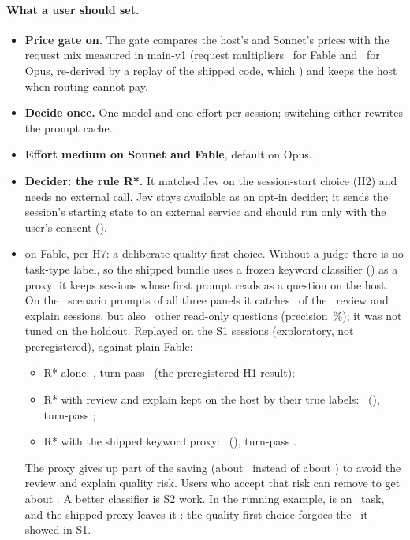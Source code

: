 \paragraph{What a user should set.}
\begin{itemize}
  \item \textbf{Price gate on.} The gate compares the host's and Sonnet's prices with the request mix measured in
    main-v1 (request multipliers \RpMultFable\ for Fable and \RpMultOpus\ for Opus, re-derived by a replay of the
    shipped code, which \RpPass) and keeps the host when routing cannot pay.
  \item \textbf{Decide once.} One model and one effort per session; switching either rewrites the prompt cache.
  \item \textbf{Effort medium on Sonnet and Fable}, default on Opus.
  \item \textbf{Decider: the rule R*.} It matched Jev on the session-start choice (H2) and needs no external call. Jev
    stays available as an opt-in decider; it sends the session's starting state to an external service and should run
    only with the user's consent ().
  \item \textbf{} on Fable, per H7: a deliberate quality-first choice. Without a
    judge there is no task-type label, so the shipped bundle uses a frozen keyword classifier (\code{\KpClassifier}) as a
    proxy: it keeps sessions whose first prompt reads as a question on the host. On the \KpPrompts\ scenario prompts of
    all three panels it catches \KpCaught\ of the \KpRexN\ review and explain sessions, but also \KpOthers\ other
    read-only questions (precision \KpPrecision\,\%); it was not tuned on the holdout. Replayed on the S1 sessions
    (exploratory, not preregistered), against plain Fable:
    \begin{itemize}
      \item R* alone: \SHOneRatio\X, turn-pass \SHOneDtp\ (the preregistered H1 result);
      \item R* with review and explain kept on the host by their true labels: \KpOracleRatio\X\ (\KpOracleCI), turn-pass
        \KpOracleDtp;
      \item R* with the shipped keyword proxy: \KpProxyRatio\X\ (\KpProxyCI), turn-pass \KpProxyDtp.
    \end{itemize}
    The proxy gives up part of the saving (about \KpProxyTwo\X\ instead of about \KpRstarTwo\X) to avoid the review and
    explain quality risk. Users who accept that risk can remove  to get about \KpRstarTwo\X. A
    better classifier is S2 work. In the running example, \code{\WxScen} is an \WxTaskType\ task, and the
    shipped proxy leaves it \WxKeptByProxy: the quality-first choice forgoes the \WxRatio\X\ it showed in S1.
\end{itemize}

